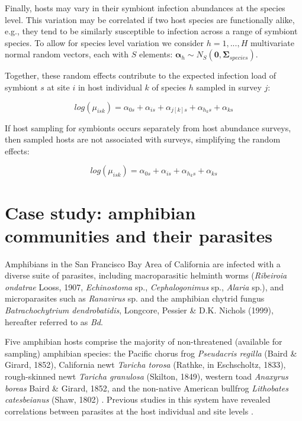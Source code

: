 Finally, hosts may vary in their symbiont infection abundances at the species level. This variation may be correlated if two host species are functionally alike, e.g., they tend to be similarly susceptible to infection across a range of symbiont species.
To allow for species level variation we consider $h=1, ..., H$ multivariate normal random vectors, each with $S$ elements: $\boldsymbol{\alpha}_{h} \sim N_S(\boldsymbol{0}, \boldsymbol{\Sigma}_{species})$.

Together, these random effects contribute to the expected infection load of symbiont $s$ at site $i$ in host individual $k$ of species $h$ sampled in survey $j$:

\begin{equation*}
log(\mu_{isk}) = \alpha_{0s} + \alpha_{is} + \alpha_{j[k]s} + \alpha_{h_k s} + \alpha_{ks}
\tag{eqn 6}
\end{equation*}

If host sampling for symbionts occurs separately from host abundance surveys, then sampled hosts are not associated with surveys, simplifying the random effects:

\begin{equation*}
log(\mu_{isk}) = \alpha_{0s} + \alpha_{is} + \alpha_{h_k s} + \alpha_{ks}
\tag{eqn 7}
\end{equation*}

\section{Case study: amphibian communities and their parasites}

Amphibians in the San Francisco Bay Area of California are infected with a diverse suite of parasites, including macroparasitic helminth worms (\textit{Ribeiroia ondatrae} Looss, 1907, \textit{Echinostoma} sp., \textit{Cephalogonimus} sp., \textit{Alaria} sp.), and microparasites such as \textit{Ranavirus} sp. and the amphibian chytrid fungus \textit{Batrachochytrium dendrobatidis}, Longcore, Pessier \& D.K. Nichols (1999), hereafter referred to as \textit{Bd}.

Five amphibian hosts comprise the majority of non-threatened (available for sampling) amphibian species: the Pacific chorus frog \textit{Pseudacris regilla} (Baird \& Girard, 1852), California newt \textit{Taricha torosa} (Rathke, in Eschscholtz, 1833), rough-skinned newt \textit{Taricha granulosa} (Skilton, 1849), western toad \textit{Anaxyrus boreas} Baird \& Girard, 1852, and the non-native American bullfrog \textit{Lithobates catesbeianus} (Shaw, 1802) \citep{Johnson2013}.
Previous studies in this system have revealed correlations between parasites at the host individual and site levels \citep{Johnson2011c, Hoverman2013}.

